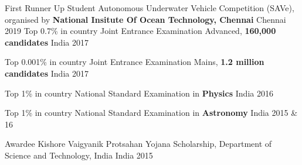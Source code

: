 
\begin{cvhonors}
  \cvhonor
    {First Runner Up}
    {Student Autonomous Underwater Vehicle Competition (SAVe), \break organised by\textbf{ National Insitute Of Ocean Technology, Chennai}} 
    {Chennai} 
    {2019}
  \cvhonor
    {Top 0.7\% in country}
    {Joint Entrance Examination Advanced, \textbf{160,000 candidates}} 
    {India} 
    {2017}

  \cvhonor
    {Top 0.001\% in country} 
    {Joint Entrance Examination Mains, \textbf{1.2 million candidates}} 
    {India}
    {2017}

 \cvhonor
    {Top 1\% in country} 
    {National Standard Examination in \textbf{Physics}}
    {India}
    {2016}
 
 \cvhonor
    {Top 1\% in country} 
    {National Standard Examination in \textbf{Astronomy}}
    {India}
    {2015 \& 16}
 
  \cvhonor
    {Awardee} 
    {Kishore Vaigyanik Protsahan Yojana Scholarship, Department of Science and Technology, India}
    {India}
    {2015}
  

\end{cvhonors}